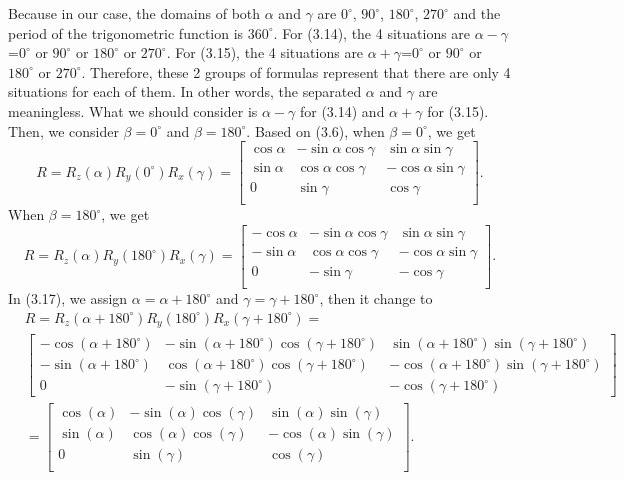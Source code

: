 Because in our case, the domains of both $\alpha$ and $\gamma$ are $0^{\circ}$, $90^{\circ}$, $180^{\circ}$, $270^{\circ}$ and the period of the trigonometric function is $360^{\circ}$. For (3.14), the 4 situations are $\alpha-\gamma$=$0^{\circ}$ or $90^{\circ}$ or $180^{\circ}$ or $270^{\circ}$. For (3.15), the 4 situations are $\alpha+\gamma$=$0^{\circ}$ or $90^{\circ}$ or $180^{\circ}$ or $270^{\circ}$. Therefore, these 2 groups of formulas represent that there are only 4 situations for each of them. In other words, the separated $\alpha$ and $\gamma$ are meaningless. What we should consider is $\alpha-\gamma$ for (3.14) and $\alpha+\gamma$ for (3.15).\\ 
Then, we consider  $\beta=0^{\circ}$ and $\beta=180^{\circ}$. Based on (3.6), when $\beta=0^{\circ}$, we get
\begin{equation}
R=R_{z}(\alpha)R_{y}(0^{\circ})R_{x}(\gamma)=
\begin{bmatrix}
\cos\alpha&-\sin\alpha\cos\gamma&\sin\alpha\sin\gamma\\
\sin\alpha&\cos\alpha\cos\gamma&-\cos\alpha\sin\gamma\\
0&          \sin\gamma&\cos\gamma\\
\end{bmatrix}.
\end{equation}
When $\beta=180^{\circ}$, we get
\begin{equation}
R=R_{z}(\alpha)R_{y}(180^{\circ})R_{x}(\gamma)=
\begin{bmatrix}
-\cos\alpha&-\sin\alpha\cos\gamma&\sin\alpha\sin\gamma\\
-\sin\alpha&\cos\alpha\cos\gamma&-\cos\alpha\sin\gamma\\
0&                               -\sin\gamma&-\cos\gamma\\
\end{bmatrix}.
\end{equation}
In (3.17), we assign $\alpha=\alpha+180^{\circ}$ and $\gamma=\gamma+180^{\circ}$, then it change to
\begin{equation}
\begin{aligned}
&R=R_{z}(\alpha+180^{\circ})R_{y}(180^{\circ})R_{x}(\gamma+180^{\circ})=\\
&\begin{bmatrix}
-\cos(\alpha+180^{\circ})&-\sin(\alpha+180^{\circ})\cos(\gamma+180^{\circ})&\sin(\alpha+180^{\circ})\sin(\gamma+180^{\circ})\\
-\sin(\alpha+180^{\circ})&\cos(\alpha+180^{\circ})\cos(\gamma+180^{\circ})&-\cos(\alpha+180^{\circ})\sin(\gamma+180^{\circ})\\
0&                               -\sin(\gamma+180^{\circ})&-\cos(\gamma+180^{\circ})
\end{bmatrix}\\
&=\begin{bmatrix}
\cos(\alpha)&-\sin(\alpha)\cos(\gamma)&\sin(\alpha)\sin(\gamma)\\
\sin(\alpha)&\cos(\alpha)\cos(\gamma)&-\cos(\alpha)\sin(\gamma)\\
0&                               \sin(\gamma)&\cos(\gamma)\\
\end{bmatrix}.
\end{aligned}
\end{equation}
